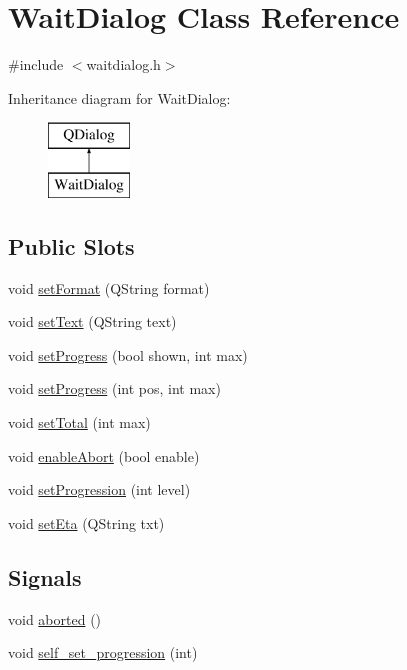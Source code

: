 \hypertarget{class_wait_dialog}{}\section{Wait\+Dialog Class Reference}
\label{class_wait_dialog}


{\ttfamily \#include $<$waitdialog.\+h$>$}

Inheritance diagram for Wait\+Dialog\+:\begin{figure}[H]
\begin{center}
\leavevmode
\includegraphics[height=2.000000cm]{d4/daa/class_wait_dialog}
\end{center}
\end{figure}
\subsection*{Public Slots}
\begin{DoxyCompactItemize}
\item 
void \mbox{\hyperlink{class_wait_dialog_aba0d21b4a9c919dbd3d1da7715b190a2}{set\+Format}} (Q\+String format)
\item 
void \mbox{\hyperlink{class_wait_dialog_ad85c079019be4a00fb92c4c5bf9c809d}{set\+Text}} (Q\+String text)
\item 
void \mbox{\hyperlink{class_wait_dialog_a87ad218e617189494f147d92795e0631}{set\+Progress}} (bool shown, int max)
\item 
void \mbox{\hyperlink{class_wait_dialog_afaf2e714ddeff8f6bea99471f576f489}{set\+Progress}} (int pos, int max)
\item 
void \mbox{\hyperlink{class_wait_dialog_a40523d825231c1b8838389618026ab87}{set\+Total}} (int max)
\item 
void \mbox{\hyperlink{class_wait_dialog_ab7ea862a3fc19b1cc3586f7bf3fb67ef}{enable\+Abort}} (bool enable)
\item 
void \mbox{\hyperlink{class_wait_dialog_aa159c59b6bc1b6388e7fefc2c77f5a9c}{set\+Progression}} (int level)
\item 
void \mbox{\hyperlink{class_wait_dialog_a01963c2c1fb1347312dd49dcf5a7485b}{set\+Eta}} (Q\+String txt)
\end{DoxyCompactItemize}
\subsection*{Signals}
\begin{DoxyCompactItemize}
\item 
void \mbox{\hyperlink{class_wait_dialog_ab10b3b29a26766060425e76bdd5f983c}{aborted}} ()
\item 
void \mbox{\hyperlink{class_wait_dialog_a7af3286633d36f4c1e84b64dbcdd24f4}{self\+\_\+set\+\_\+progression}} (int)
\end{DoxyCompactItemize}
